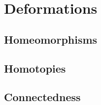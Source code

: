 \section{Deformations}


\subsection{Homeomorphisms}




\subsection{Homotopies}



\subsection{Connectedness}



\begin{comment}


\end{comment}